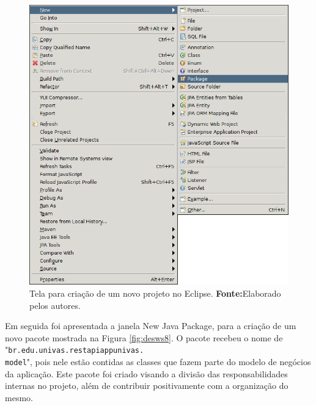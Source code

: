 	\begin{figure}[h!]
		\centerline{\includegraphics[scale=0.8]{./imagens/2_q_metodologico/4_procedimentos_resultados/43_webservice/432_desenvolvimento/desws7.png}}
		\caption[Tela para criação de um novo projeto no Eclipse]{Tela para criação de um novo projeto no Eclipse.
			\textbf{Fonte:}Elaborado pelos autores.}
		\label{fig:desws7}
	\end{figure}
	
	\pagebreak 
	
	\par Em seguida foi apresentada a janela New Java Package, para a criação de
um novo pacote mostrada na Figura \ref{fig:desws8}. O pacote recebeu o nome de
"\texttt{br.edu.univas.restapiappunivas.\\model}", pois nele estão contidas as
classes que fazem parte do modelo de negócios da aplicação. Este pacote foi
criado visando a divisão das responsabilidades internas no projeto, além de
contribuir positivamente com a organização do mesmo.

